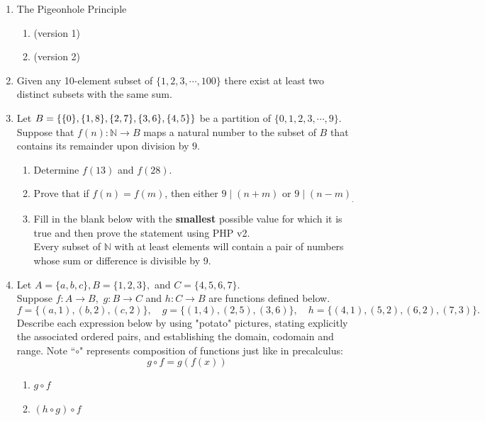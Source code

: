 \documentclass[12pt]{article}
\renewcommand{\emph}[1]{\textsf{\textbf{#1}}}
\newcommand{\N}{\mathbb{N}}
\begin{document}
\begin{enumerate}
\item The Pigeonhole Principle
	\begin{enumerate}
	\item (version 1)
	\vspace{0.5in}
	\item (version 2)
	\vspace{0.5in}
	\end{enumerate}
\item  Given any 10-element subset of $\{1,2,3, \cdots, 100\}$ there exist at least two distinct subsets with the same sum.
\vfill
\item Let $B=\large\{ \{0\}, \{1,8\},\{2,7\}, \{3,6\},\{4,5\}\large\}$ be a partition  of $\{0,1,2,3,\cdots,9\}.$ \\ Suppose that $f(n): \N \to B$ maps a natural number to the subset of $B$ that contains its remainder upon division by $9.$
	\begin{enumerate}
	\item  Determine $f(13)$ and $f(28).$
	\vspace{1in}
	\item Prove that if $f(n)=f(m)$, then either $9 \mid (n+m)$ or $9 \mid (n-m)_.$
	\vfill
	\newpage
	\item Fill in the blank below with the \emph{smallest} possible value for which it is true and then prove the statement using PHP v2. \\
	
	{Every} subset of $\N$ with at least \underline{\hspace{.5in}} elements will contain a pair of numbers whose sum or difference is divisible by 9. 
	
	\vfill
	\end{enumerate}
\item Let $A=\{a,b,c\}, B=\{1,2,3\},$ and $C=\{4,5,6,7\}.$ \\
Suppose $f:A \to B,$ $g:B \to C$ and $h: C \to B$ are functions defined below.	\\
$$f=\{(a,1),(b,2),(c,2)\}, \quad g=\{(1,4),(2,5),(3,6)\}, \quad  h=\{(4,1),(5,2),(6,2),(7,3)\}.$$
Describe each expression below by using "potato" pictures, stating explicitly the associated ordered pairs, and establishing the domain, codomain and range.  Note ``$\circ$" represents composition of functions just like in precalculus:
$$g\circ f = g(f(x))$$
	\begin{enumerate}
	\item $g \circ f$
	\vfill
	\item $(h \circ g) \circ f$
	\vfill
	\end{enumerate}
\end{enumerate}
\end{document}
